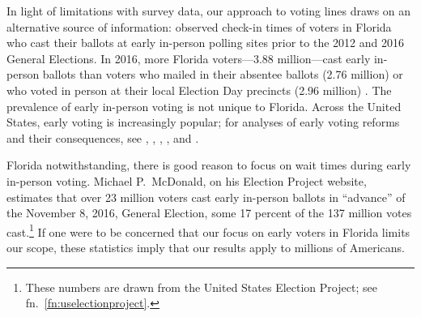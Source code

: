 \documentclass[12pt,titlepage]{article}
\begin{document}
In light of limitations with survey data, our approach to voting lines
draws on an alternative source of information: observed check-in times
of voters in Florida who cast their ballots at early in-person polling
sites prior to the 2012 and 2016 General Elections.  In 2016, more
Florida voters---3.88 million---cast early in-person ballots than
voters who mailed in their absentee ballots (2.76 million) or who
voted in person at their local Election Day precincts (2.96 million)
\citep{FDOS:2016vote}. The prevalence of early in-person voting is not
unique to Florida. Across the United States, early voting is
increasingly popular; for analyses of early voting reforms and their
consequences, see \citet{neelyrichardson:earlyvoting},
\citet{gronkebaum:growth}, \citet{gronketoffey:psychological},
\citet{gronke:2012}, and \citet{burdenetal:unanticipated}.




Florida notwithstanding, there is good reason to focus on wait times
during early in-person voting.  Michael P.\ McDonald, on his Election
Project website, estimates that over 23 million voters cast early
in-person ballots in ``advance'' of the November 8, 2016, General
Election, some 17 percent of the 137 million votes
cast.\footnote{These numbers are drawn from the United States Election
  Project; see fn.\ \ref{fn:uselectionproject}.}  If one were to be
concerned that our focus on early voters in Florida limits our scope,
these statistics imply that our results apply to millions of
Americans.
\end{document}
